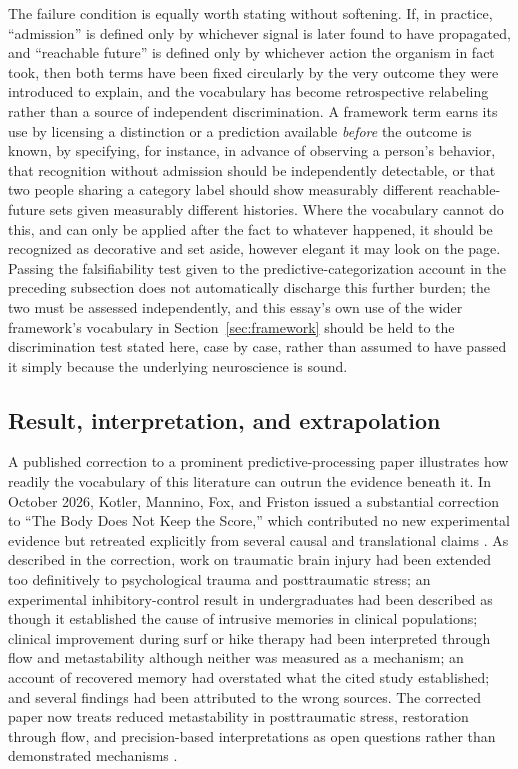 \documentclass[11pt]{article}
\begin{document}
The failure condition is equally worth stating without softening. If, in practice, ``admission'' is defined only by whichever signal is later found to have propagated, and ``reachable future'' is defined only by whichever action the organism in fact took, then both terms have been fixed circularly by the very outcome they were introduced to explain, and the vocabulary has become retrospective relabeling rather than a source of independent discrimination. A framework term earns its use by licensing a distinction or a prediction available \emph{before} the outcome is known, by specifying, for instance, in advance of observing a person's behavior, that recognition without admission should be independently detectable, or that two people sharing a category label should show measurably different reachable-future sets given measurably different histories. Where the vocabulary cannot do this, and can only be applied after the fact to whatever happened, it should be recognized as decorative and set aside, however elegant it may look on the page. Passing the falsifiability test given to the predictive-categorization account in the preceding subsection does not automatically discharge this further burden; the two must be assessed independently, and this essay's own use of the wider framework's vocabulary in Section~\ref{sec:framework} should be held to the discrimination test stated here, case by case, rather than assumed to have passed it simply because the underlying neuroscience is sound.

\subsection{Result, interpretation, and extrapolation}

A published correction to a prominent predictive-processing paper illustrates how readily the vocabulary of this literature can outrun the evidence beneath it. In October 2026, Kotler, Mannino, Fox, and Friston issued a substantial correction to ``The Body Does Not Keep the Score,'' which contributed no new experimental evidence but retreated explicitly from several causal and translational claims \citep{Kotler2026}. As described in the correction, work on traumatic brain injury had been extended too definitively to psychological trauma and posttraumatic stress; an experimental inhibitory-control result in undergraduates had been described as though it established the cause of intrusive memories in clinical populations; clinical improvement during surf or hike therapy had been interpreted through flow and metastability although neither was measured as a mechanism; an account of recovered memory had overstated what the cited study established; and several findings had been attributed to the wrong sources. The corrected paper now treats reduced metastability in posttraumatic stress, restoration through flow, and precision-based interpretations as open questions rather than demonstrated mechanisms \citep{Kotler2026}.
\end{document}

